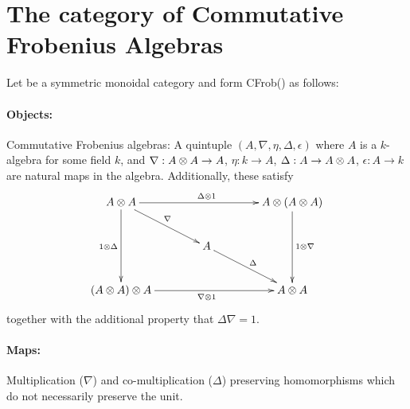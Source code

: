 \section{The category of Commutative Frobenius Algebras} %
\label{sec:the_category_of_commutative_frobenius_algebras}
\begin{example}\label{example:commfrob}
  Let \X be a symmetric monoidal category and form CFrob(\X) as follows: \paragraph{Objects:}
  Commutative Frobenius algebras\cite{kock04}: A quintuple $(A,\nabla,\eta,\Delta,\epsilon)$ where
  $A$ is a $k$-algebra for some field $k$, and $\nabla :A\otimes A \to A$, $\eta:k\to A$, $\Delta : A \to
  A\otimes A$, $\epsilon : A \to k$ are natural maps in the algebra. Additionally, these satisfy
  \[
    \xymatrix @C=40pt @R=25pt{
      A \* A \ar[dd]_{1\*\Delta} \ar[dr]^{\nabla}
        \ar[rr]^{\Delta \* 1} & &
        A \* (A \* A) \ar[dd]^{1 \* \nabla}\\
      & A \ar[dr]^{\Delta} & \\
      (A \* A) \* A \ar[rr]_{\nabla \* 1} & &
        A \* A
    }
  \]
  together with the additional property that $\Delta \nabla = 1$.

  \paragraph{Maps:} Multiplication ($\nabla$) and co-multiplication ($\Delta$) preserving
  homomorphisms which do not necessarily preserve the unit.
\end{example}


